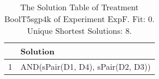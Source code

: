 \begin{table}[ht]
\centering
\begin{tabular}{rp{9cm}}
  \hline
 & Solution \\ 
  \hline
1 & AND(sPair(D1, D4), sPair(D2, D3)) \\ 
   \hline
\end{tabular}
\caption{The Solution Table of Treatment BoolT5sgp4k of Experiment ExpF. Fit: 0. Unique Shortest Solutions: 8.} 
\end{table}
